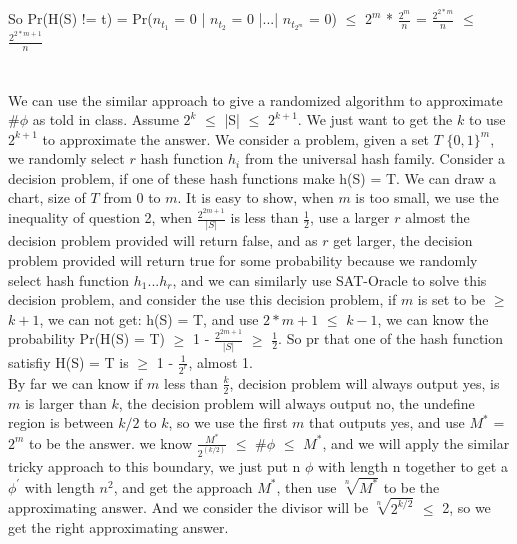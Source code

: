\documentclass[11pt]{article}
\begin{document}
So Pr(H(S) != t) = Pr($n_{t_{1}}$ = 0 | $n_{t_{2}}$ = 0 |...| $n_{t_{2^{m}}}$ = 0) $\leq$ $2^{m}$ * $\frac{2^{m}}{n}$ = $\frac{2^{2*m}}{n}$ $\leq$ $\frac{2^{2*m+1}}{n}$

\part{}
We can use the similar approach to give a randomized algorithm to approximate \#$\phi$ as told in class. Assume $2^{k}$ $\leq$ |S| $\leq$ $2^{k+1}$. We just want to get the $k$ to use $2^{k+1}$ to approximate the answer. We consider a problem, given a set $T$ $\{0,1\}^{m}$, we randomly select $r$ hash function $h_{i}$ from the universal hash family. Consider a decision problem, if one of these hash functions make h(S) = T. We can draw a chart, size of $T$ from 0 to $m$. It is easy to show, when $m$ is too small, we use the inequality of question 2, when 
$\frac{2^{2m+1}}{|S|}$ is less than $\frac{1}{2}$, use a larger $r$ almost the decision problem provided will return false, and as $r$ get larger, the decision problem provided will return true for some probability because we randomly select hash function $h_{1}...h_{r}$, and we can similarly use SAT-Oracle to solve this decision problem, and consider the use this decision problem, if $m$ is set to be $\geq$ $k+1$, we can not get:  h(S) = T, and use $2*m+1$ $\leq$ $k-1$, we can know the probability Pr(H(S) = T) $\geq$ 1 - $\frac{2^{2m+1}}{|S|}$ $\geq$ $\frac{1}{2}$. So pr that one of the hash function satisfiy H(S) = T is $\geq$ 1 - $\frac{1}{2^{r}}$, almost 1. \\
By far we can know if $m$ less than $\frac{k}{2}$, decision problem will always output yes, is $m$ is larger than $k$, the decision problem will always output no, the undefine region is between $k/2$ to $k$, so we use the first $m$ that outputs yes, and use $M^{*}$ = $2^{m}$ to be the answer. we know $\frac{M^{*}}{2^(k/2)}$ $\leq$ \#$\phi$ $\leq$ $M^{*}$, and we will apply the similar tricky approach to this boundary, we just put n $\phi$ with length n together to get a $\phi^{'}$ with length $n^{2}$, and get the approach $M^{*}$, then use $\sqrt[n]{M^{*}}$ to be the approximating answer. And we consider the divisor will be $\sqrt[n]{2^{k/2}}$ $\leq$ 2, so we get the right approximating answer.
\end{document}
